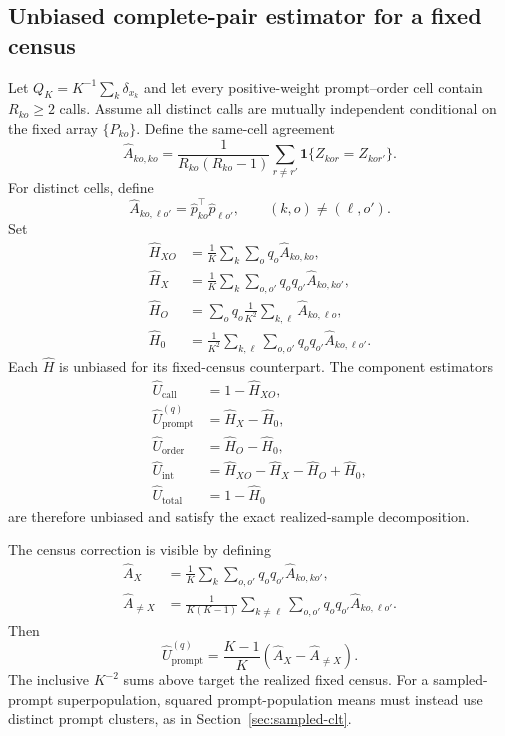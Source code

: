 \documentclass[letterpaper]{article}
\newcommand{\1}{\mathbf 1}
\newcommand{\Up}{U_{\mathrm{prompt}}}
\newcommand{\Uc}{U_{\mathrm{call}}}
\newcommand{\Uo}{U_{\mathrm{order}}}
\newcommand{\Ui}{U_{\mathrm{int}}}
\newcommand{\Ut}{U_{\mathrm{total}}}
\begin{document}
\subsection{Unbiased complete-pair estimator for a fixed census}

Let $Q_K=K^{-1}\sum_k\delta_{x_k}$ and let every positive-weight
prompt--order cell contain $R_{ko}\ge2$ calls. Assume all distinct calls are
mutually independent conditional on the fixed array $\{P_{ko}\}$. Define
the same-cell agreement
\begin{equation}
\widehat A_{ko,ko}=
\frac{1}{R_{ko}(R_{ko}-1)}
\sum_{r\ne r'}\1\{Z_{kor}=Z_{kor'}\}.
\label{eq:s-cell-agreement-same}
\end{equation}
For distinct cells, define
\begin{equation}
\widehat A_{ko,\ell o'}
=\widehat p_{ko}^{\top}\widehat p_{\ell o'},
\qquad (k,o)\ne(\ell,o').
\label{eq:s-cell-agreement}
\end{equation}
Set
\begin{align}
\widehat H_{XO}
&=\frac1K\sum_k\sum_oq_o\widehat A_{ko,ko},\\
\widehat H_X
&=\frac1K\sum_k\sum_{o,o'}q_oq_{o'}
\widehat A_{ko,ko'},\\
\widehat H_O
&=\sum_oq_o\frac1{K^2}\sum_{k,\ell}
\widehat A_{ko,\ell o},\\
\widehat H_0
&=\frac1{K^2}\sum_{k,\ell}\sum_{o,o'}q_oq_{o'}
\widehat A_{ko,\ell o'}.
\end{align}
Each $\widehat H$ is unbiased for its fixed-census counterpart. The component
estimators
\begin{align}
\widehat\Uc&=1-\widehat H_{XO},\\
\widehat\Up^{(q)}&=\widehat H_X-\widehat H_0,\\
\widehat\Uo&=\widehat H_O-\widehat H_0,\\
\widehat\Ui
&=\widehat H_{XO}-\widehat H_X-\widehat H_O+\widehat H_0,\\
\widehat\Ut&=1-\widehat H_0
\label{eq:s-crossed-estimators}
\end{align}
are therefore unbiased and satisfy the exact realized-sample decomposition.

The census correction is visible by defining
\begin{align}
\widehat A_X
&=\frac1K\sum_k\sum_{o,o'}q_oq_{o'}\widehat A_{ko,ko'},\\
\widehat A_{\ne X}
&=\frac1{K(K-1)}\sum_{k\ne\ell}\sum_{o,o'}q_oq_{o'}
\widehat A_{ko,\ell o'}.
\end{align}
Then
\begin{equation}
\widehat\Up^{(q)}
=\frac{K-1}{K}(\widehat A_X-\widehat A_{\ne X}).
\end{equation}
The inclusive $K^{-2}$ sums above target the realized fixed census. For a
sampled-prompt superpopulation, squared prompt-population means must instead
use distinct prompt clusters, as in Section~\ref{sec:sampled-clt}.
\end{document}
